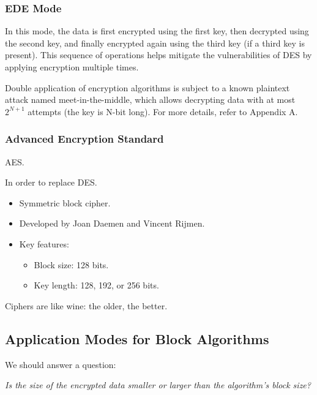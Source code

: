 \subsubsection*{EDE Mode}
In this mode, the data is first encrypted using the first key, then decrypted using the second key, and finally encrypted again using the third key (if a third key is present). This sequence of operations helps mitigate the vulnerabilities of DES by applying encryption multiple times.

\begin{tcolorbox}[colback=blue!10!white, colframe=blue!50!white, title=Meet-in-the-Middle attack]
    Double application of encryption algorithms is subject to a known plaintext attack named meet-in-the-middle, which allows decrypting data with at most $2^{N+1}$ attempts (the key is N-bit long).
    For more details, refer to Appendix A.
\end{tcolorbox}

\subsubsection{Advanced Encryption Standard}
\begin{center}
    AES.
\end{center}
In order to replace DES.

\begin{itemize}
    \item Symmetric block cipher.
    \item Developed by Joan Daemen and Vincent Rijmen.
    \item Key features:
    \begin{itemize}
        \item Block size: 128 bits.
        \item Key length: 128, 192, or 256 bits.
    \end{itemize}
\end{itemize}

\begin{tcolorbox}[colback=blue!10!white, colframe=blue!50!white]
Ciphers are like wine: the older, the better.
\end{tcolorbox}


\subsection{Application Modes for Block Algorithms}
We should answer a question:
\begin{tcolorbox}[colframe=lightblue]
    \begin{center}
        \textit{Is the size of the encrypted data smaller or larger than \newline the algorithm’s block size?}
    \end{center}
\end{tcolorbox}
    


